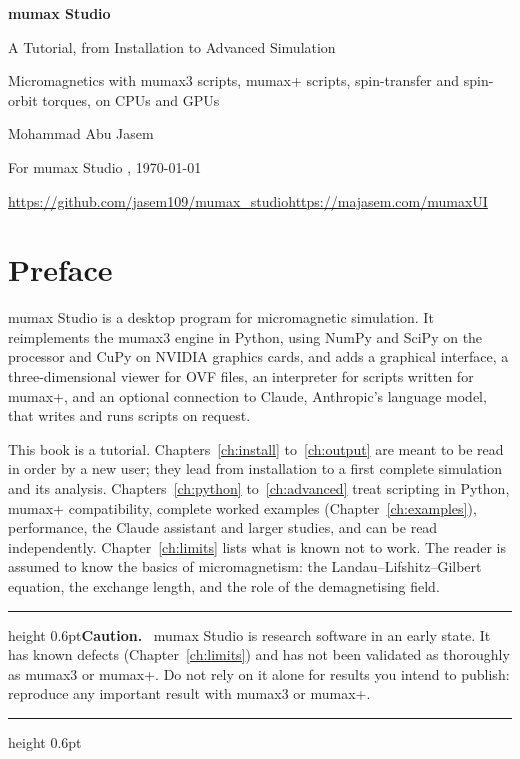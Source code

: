 \documentclass[11pt,a4paper,oneside]{book}
\renewcommand{\_}{\textunderscore\allowbreak}
\newenvironment{caution}{\par\medskip\noindent\begin{minipage}{\linewidth}\setlength{\parskip}{3pt}%
  \hrule height 0.6pt\vspace{6pt}\noindent\textbf{Caution.}\ }{\par\vspace{6pt}\hrule height 0.6pt\end{minipage}\par\medskip}
\begin{document}
\frontmatter
\begin{titlepage}
\vspace*{40mm}
{\noindent\Huge\bfseries mumax Studio\par}
\vspace{6mm}
{\noindent\LARGE A Tutorial, from Installation to Advanced Simulation\par}
\vspace{14mm}
{\noindent\large Micromagnetics with mumax3 scripts, mumax+ scripts, spin-transfer and spin-orbit torques,
on CPUs and GPUs\par}
\vfill
{\noindent\large Mohammad Abu Jasem\par}
\vspace{2mm}
{\noindent For mumax Studio \unskip, \today\par}
\vspace{2mm}
{\noindent\small\url{https://github.com/jasem109/mumax_studio}\quad\textperiodcentered\quad\url{https://majasem.com/mumaxUI}\par}
\end{titlepage}

\chapter*{Preface}

mumax Studio is a desktop program for micromagnetic simulation. It reimplements the mumax3 engine in Python,
using NumPy and SciPy on the processor and CuPy on NVIDIA graphics cards, and adds a graphical interface, a
three-dimensional viewer for OVF files, an interpreter for scripts written for mumax+, and an optional connection
to Claude, Anthropic's language model, that writes and runs scripts on request.

This book is a tutorial. Chapters~\ref{ch:install} to~\ref{ch:output} are meant to be read in order by a new user;
they lead from installation to a first complete simulation and its analysis. Chapters~\ref{ch:python}
to~\ref{ch:advanced} treat scripting in Python, mumax+ compatibility, complete worked examples
(Chapter~\ref{ch:examples}), performance, the Claude assistant and larger studies, and can be read
independently. Chapter~\ref{ch:limits} lists what is known not to work. The
reader is assumed to know the basics of micromagnetism: the Landau--Lifshitz--Gilbert equation, the exchange
length, and the role of the demagnetising field.

\begin{caution}
mumax Studio is research software in an early state. It has known defects (Chapter~\ref{ch:limits}) and has not
been validated as thoroughly as mumax3 or mumax+. Do not rely on it alone for results you intend to publish:
reproduce any important result with mumax3 or mumax+.
\end{caution}
\end{document}
